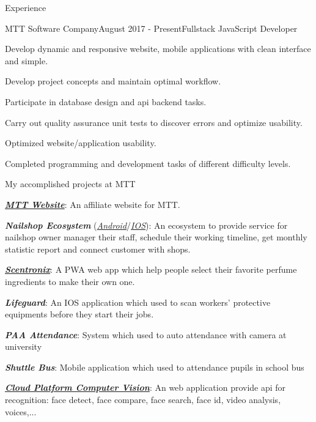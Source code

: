 \documentclass{resume}
\begin{document}
  \begin{rSection}{Experience}
    \begin{rSubsection}{MTT Software Company}{August 2017 - Present}{Fullstack JavaScript Developer}{}
      \item Develop dynamic and responsive website, mobile applications with clean interface and simple.
      \item Develop project concepts and maintain optimal workflow.
      \item Participate in database design and api backend tasks.
      \item Carry out quality assurance unit tests to discover errors and optimize usability.
      \item Optimized website/application usability.
      \item Completed programming and development tasks of different difficulty levels.
    \end{rSubsection}
     
    \begin{rSubsection}{}{}{My accomplished projects at MTT}{}
      \item \href{https://mttjsc.com/}{\emph{\bfseries{MTT Website}}}: An affiliate website for MTT.
      \item \emph{\bfseries{Nailshop Ecosystem}} (\href{https://play.google.com/store/apps/developer?id=MTT+Software+Company+LTD}{\emph{Android}}/\href{https://apps.apple.com/us/developer/mttjsc/id1250334932}{\emph{IOS}}): 
      An ecosystem to provide service for nailshop owner manager their staff, schedule their working timeline, get monthly statistic report and connect customer with shops.
      \item \href{https://app.scnt.me/}{\emph{\bfseries{Scentronix}}}: A PWA web app which help people select their favorite perfume ingredients to make their own one.
      \item {\emph{\bfseries{Lifeguard}}}: An IOS application which used to scan workers' protective equipments before they start their jobs. 
      \item {\emph{\bfseries{PAA Attendance}}}: System which used to auto attendance with camera at university
      \item {\emph{\bfseries{Shuttle Bus}}}: Mobile application which used to attendance pupils in school bus
      \item \href{https://dev.console.phenikaa.cloud/}{\emph{\bfseries{Cloud Platform Computer Vision}}}: An web application provide api for recognition: face detect, face compare, face search, face id, video analysis, voices,...
    \end{rSubsection}
  \end{rSection}
\end{document}
